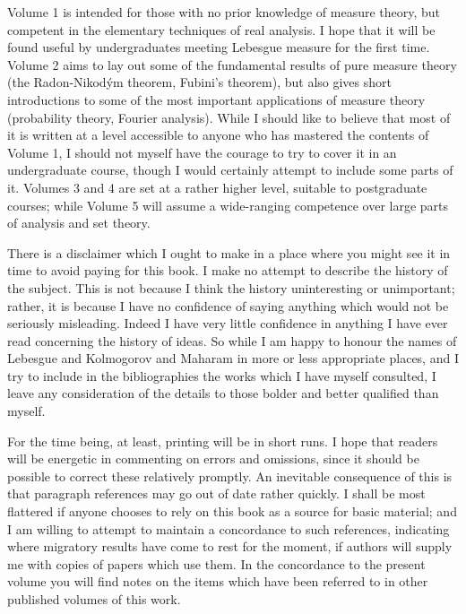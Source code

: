 \medskip

\noindent Volume 1 is intended for those with no prior knowledge of
measure theory, but competent in the elementary techniques of real
analysis.  I hope that it will be found useful by undergraduates meeting
Lebesgue measure for the first time.    Volume 2 aims to lay out some of
the fundamental results of pure measure theory (the
Radon-Nikod\'ym theorem, Fubini's theorem), but also gives short
introductions to some of the most important applications of measure
theory (probability theory, Fourier analysis).   While I should like to
believe that most of it is written at a level accessible to anyone who
has mastered the contents of Volume 1, I should not myself have the
courage to try to cover it in an undergraduate course, though I would
certainly attempt to include some parts of it.   Volumes 3 and 4 are
set at a rather higher level, suitable to postgraduate courses;  while
Volume 5 will assume a wide-ranging competence over large parts of
analysis and set theory.

There is a disclaimer which I ought to make in a place where you might
see it in time to avoid paying for this book.   I make no attempt to
describe the history of the subject.   This is not because I think the
history uninteresting or unimportant;  rather, it is because I have no
confidence of saying anything which would not be seriously misleading.
Indeed I have very little confidence in anything I have ever read
concerning the history of ideas.   So while I am happy to honour the
names of Lebesgue and Kolmogorov and Maharam in more or less appropriate
places, and I try to include in the bibliographies the works which I
have myself consulted, I leave any consideration of the details to those
bolder and better qualified than myself.

For the time being,
at least, printing will be in short runs.   I hope that readers will be
energetic in commenting on errors and omissions, since it should be
possible to correct these relatively promptly.   An inevitable
consequence of this is that paragraph references may go out of date
rather quickly.   I shall be most flattered if anyone chooses to rely on
this book as a source for basic material;  and I am willing to attempt
to maintain a concordance to such references, indicating where migratory
results have come to rest for the moment, if authors will supply me with
copies of papers which use them.   In the concordance to the present 
volume you will find notes on the items which have been referred to in
other published volumes of this work.

